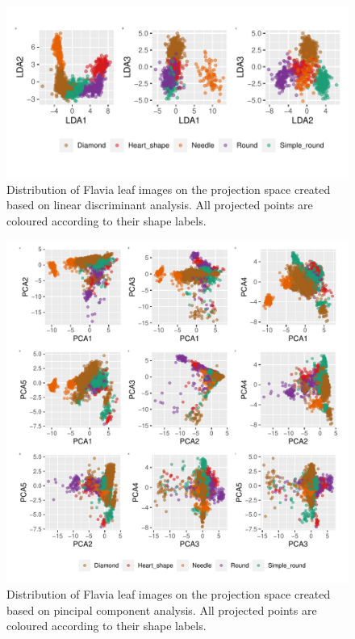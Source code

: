 \documentclass{article}
\begin{document}
\begin{figure}
\centering
\includegraphics{img/ldaflavia-1.pdf}
\caption{\label{ldaflavia}Distribution of Flavia leaf images on the
projection space created based on linear discriminant analysis. All
projected points are coloured according to their shape labels.}
\end{figure}

\begin{figure}
\centering
\includegraphics{img/pcaflavia-1.pdf}
\caption{\label{pcaflavia}Distribution of Flavia leaf images on the
projection space created based on pincipal component analysis. All
projected points are coloured according to their shape labels.}
\end{figure}
\end{document}
